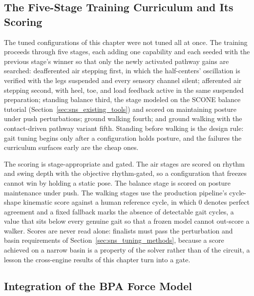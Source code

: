 \subsection{The Five-Stage Training Curriculum and Its Scoring}\label{sec:sns_curriculum}

The tuned configurations of this chapter were not tuned all at once. The training proceeds through five stages, each adding one capability and each seeded with the previous stage's winner so that only the newly activated pathway gains are searched: deafferented air stepping first, in which the half-centers' oscillation is verified with the legs suspended and every sensory channel silent; afferented air stepping second, with heel, toe, and load feedback active in the same suspended preparation; standing balance third, the stage modeled on the SCONE balance tutorial (Section~\ref{sec:sns_existing_tools}) and scored on maintaining posture under push perturbations; ground walking fourth; and ground walking with the contact-driven pathway variant fifth. Standing before walking is the design rule: gait tuning begins only after a configuration holds posture, and the failures the curriculum surfaces early are the cheap ones.

The scoring is stage-appropriate and gated. The air stages are scored on rhythm and swing depth with the objective rhythm-gated, so a configuration that freezes cannot win by holding a static pose. The balance stage is scored on posture maintenance under push. The walking stages use the production pipeline's cycle-shape kinematic score against a human reference cycle, in which 0 denotes perfect agreement and a fixed fallback marks the absence of detectable gait cycles, a value that sits below every genuine gait so that a frozen model cannot out-score a walker. Scores are never read alone: finalists must pass the perturbation and basin requirements of Section~\ref{sec:sns_tuning_methods}, because a score achieved on a narrow basin is a property of the solver rather than of the circuit, a lesson the cross-engine results of this chapter turn into a gate.

\subsection{Integration of the BPA Force Model}\label{sec:sns_bpa_integration}

